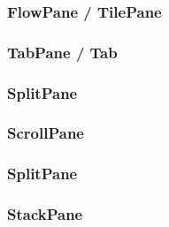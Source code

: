 \subsubsection{FlowPane / TilePane}

\subsubsection{TabPane / Tab}

\subsubsection{SplitPane}

\subsubsection{ScrollPane}

\subsubsection{SplitPane}

\subsubsection{StackPane}

